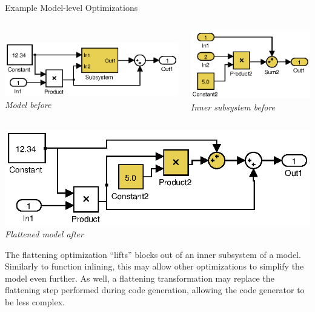 \documentclass[final,hyperref={pdfpagelabels=false}]{beamer}
\begin{document}
\begin{frame}{}
\begin{columns}[t,totalwidth=\linewidth]
\begin{column}{.585\linewidth}
\begin{block}{Example Model-level Optimizations}
                 \vspace{-0.3cm}
         \begin{columns}[c,totalwidth=\linewidth]
         \begin{column}{.485\linewidth}
         \begin{center}
         ~\\
         \includegraphics[width=0.8\linewidth]{images/models/Flatten1}\\
         \footnotesize \textit{Model before}
         \end{center}
         \end{column}
         \begin{column}{.485\linewidth}
         \begin{center}
         \vspace{-0.6cm}
         \includegraphics[width=0.6\linewidth]{images/models/Flatten1_subsystem}\\
         \footnotesize \textit{Inner subsystem before}
         \end{center}
         \end{column}
         \end{columns}
         \begin{center}
          \includegraphics[width=0.5\linewidth]{images/models/Flatten1_export}\\
          \footnotesize \textit{Flattened model after}
          \end{center}
         \footnotesize
         The flattening optimization ``lifts'' blocks out of an inner subsystem of a model. Similarly to function inlining, this may allow other optimizations to simplify the model even further. As well, a flattening transformation may replace the flattening step performed during code generation, allowing the code generator to be less complex.
         \vspace{0.5cm}
        \end{block}
        

\end{column}
\end{columns}
\end{frame}
\end{document}
